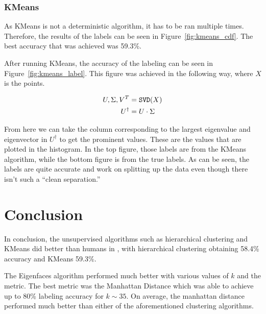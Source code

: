 \documentclass{article}
\begin{document}
\subsubsection*{KMeans}

As KMeans is not a deterministic algorithm, it has to be ran multiple times. Therefore, the results of the labels can be seen in Figure~\ref{fig:kmeans_cdf}. The best accuracy that was achieved was 59.3\%. 

After running KMeans, the accuracy of the labeling can be seen in Figure~\ref{fig:kmeans_label}. This figure was achieved in the following way, where $X$ is the points.

\begin{align*}
  U, \Sigma, V^{T} &= {\tt SVD}(X)\\
  U^{\dagger} &= U\cdot \Sigma
\end{align*}

From here we can take the column corresponding to the largest eigenvalue and eigenvector in $U^{\dagger}$ to get the prominent values. These are the values that are plotted in the histogram. In the top figure, those labels are from the KMeans algorithm, while the bottom figure is from the true labels. As can be seen, the labels are quite accurate and work on splitting up the data even though there isn't such a ``clean separation.''

\section*{Conclusion}

In conclusion, the unsupervised algorithms such as hierarchical clustering and KMeans did better than humans in \cite{MormonID}, with hierarchical clustering obtaining 58.4\% accuracy and KMeans 59.3\%. 

The Eigenfaces algorithm performed much better with various values of $k$ and the metric. The best metric was the Manhattan Distance which was able to achieve up to 80\% labeling accuracy for $k \sim 35$. On average, the manhattan distance performed much better than either of the aforementioned clustering algorithms. 
\end{document}
